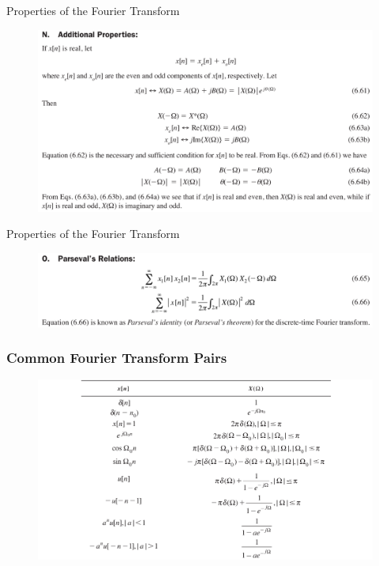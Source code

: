 \documentclass[pdflatex,compress,mathserif]{beamer}
\begin{document}
\begin{frame}{Properties of the Fourier Transform}
	\begin{figure}
		\centering
		\includegraphics[width=\linewidth]{img/img19}
	\end{figure}
\end{frame}

\begin{frame}{Properties of the Fourier Transform}
	\begin{figure}
		\centering
		\includegraphics[width=\linewidth]{img/img20}
	\end{figure}
\end{frame}

\begin{frame}
	\frametitle{Common Fourier Transform Pairs}
	\begin{figure}
		\centering
		\includegraphics[width=\linewidth]{img/img21}
	\end{figure}
\end{frame}
\end{document}
